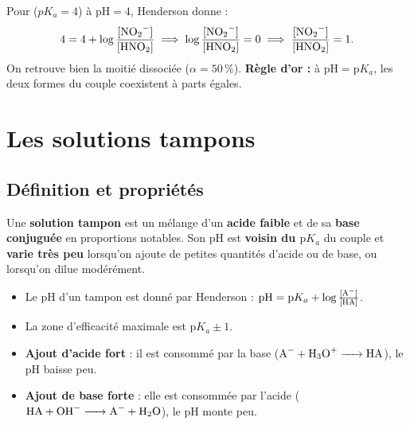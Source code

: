 \documentclass[11pt,a4paper]{article}
\begin{document}
\begin{exemple}[QCM 17 revisité : $\mathrm{pH}=\mathrm{p}K_a$ implique 50/50]
Pour  ($pK_a=4$) à $\mathrm{pH}=4$, Henderson donne :
\[ 4 = 4 + \log\frac{[\ce{NO2-}]}{[\ce{HNO2}]} \;\Longrightarrow\; \log\frac{[\ce{NO2-}]}{[\ce{HNO2}]}=0
   \;\Longrightarrow\; \frac{[\ce{NO2-}]}{[\ce{HNO2}]}=1. \]
On retrouve bien la moitié dissociée ($\alpha=50\,\%$). \textbf{Règle d'or :} à $\mathrm{pH}=\mathrm{p}K_a$,
les deux formes du couple coexistent à parts égales.
\end{exemple}

\section{Les solutions tampons}

\subsection{Définition et propriétés}

\begin{definition}
Une \textbf{solution tampon} est un mélange d'un \textbf{acide faible} et de sa \textbf{base conjuguée} en
proportions notables. Son pH est \textbf{voisin du $\mathrm{p}K_a$} du couple et \textbf{varie très peu}
lorsqu'on ajoute de petites quantités d'acide ou de base, ou lorsqu'on dilue modérément.
\end{definition}

\begin{regle}
\begin{itemize}[leftmargin=1.6em,topsep=2pt,itemsep=2pt]
  \item Le pH d'un tampon est donné par Henderson : $\mathrm{pH} = \mathrm{p}K_a + \log\frac{[\ce{A-}]}{[\ce{HA}]}$.
  \item La zone d'efficacité maximale est $\mathrm{p}K_a \pm 1$.
  \item \textbf{Ajout d'acide fort} : il est consommé par la base  ($\ce{A- + H3O+ -> HA}$), le pH
        baisse peu.
  \item \textbf{Ajout de base forte} : elle est consommée par l'acide  ($\ce{HA + OH- -> A- + H2O}$),
        le pH monte peu.
\end{itemize}
\end{regle}
\end{document}
